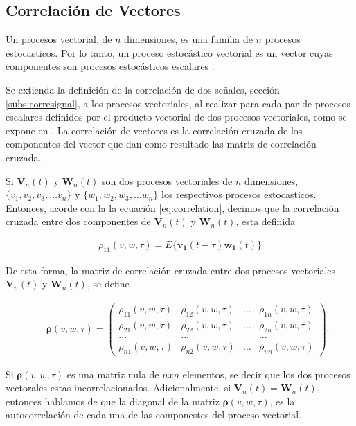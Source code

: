 \subsection{Correlación de Vectores}\label{subs:correvector}

Un procesos vectorial, de $n$ dimensiones, es una familia de $n$ procesos
estocasticos. Por lo tanto, un proceso estocástico vectorial es un
vector cuyas componentes son procesos estocásticos escalares \cite{Requena08}.

Se extienda la definición de la correlación de dos señales, sección
\ref{subs:corresignal}, a los procesos vectoriales, al realizar para cada par de
procesos escalares  definidos por el producto vectorial de dos procesos
vectoriales, como se expone en \cite{Requena08}. La correlación de vectores es la correlación cruzada de los
componentes del vector que dan como resultado las matriz de correlación
cruzada.

Si $\mathbf{V}_n(t)$ y $\mathbf{W}_n(t)$ son dos procesos vectoriales  de $n$
dimensiones, $\{v_1, v_2, v_3, \ldots v_n\}$ y  $\{w_1, w_2, w_3, \ldots
w_n\}$ los respectivos procesos estocasticos. Entonces, acorde con la
la ecuación \ref{eq:correlation}, decimos que la correlación cruzada entre dos
componentes de $\mathbf{V}_n(t)$ y $\mathbf{W}_n(t)$, esta definida

 \begin{eqnarray}\label{eq:correlationCompVector}
 {\rho_{11}}(v,w,\tau)=E{\{ \mathbf{v_1}(t-\tau)\mathbf{w_1}(t) \}}
 \end{eqnarray}

De esta forma, la matriz de correlación cruzada entre dos procesos vectoriales
$\mathbf{V}_n(t)$ y $\mathbf{W}_n(t)$, se define

 \begin{eqnarray}\label{eq:correlationVector}
 &&\boldsymbol{\rho}(v,w,\tau)
 = \left( \begin{array}{cccc}
 {\rho}_{11}(v,w,\tau) & {\rho}_{12}(v,w,\tau) & \ldots &{\rho}_{1n}(v,w,\tau)\\
 {\rho}_{21}(v,w,\tau) & {\rho}_{22}(v,w,\tau) & \ldots &{\rho}_{2n}(v,w,\tau)\\
 \ldots & \ldots& & \ldots\\
 {\rho}_{n1}(v,w,\tau) & {\rho}_{n2}(v,w,\tau) & \ldots &{\rho}_{nn}(v,w,\tau)
 \end{array} \right).
 \end{eqnarray}


Si  $\boldsymbol{\rho}(v,w,\tau)$  es una matriz  nula de $nxn$ elementos, se
decir que los dos procesos vectorales estas incorrelacionados. Adicionalmente,
si $\mathbf{V}_n(t) = \mathbf{W}_n(t)$, entonces hablamos de que la diagonal de la
matriz $\boldsymbol{\rho}(v,w,\tau)$, es la autocorrelación de cada una de las
componestes del  proceso vectorial.


